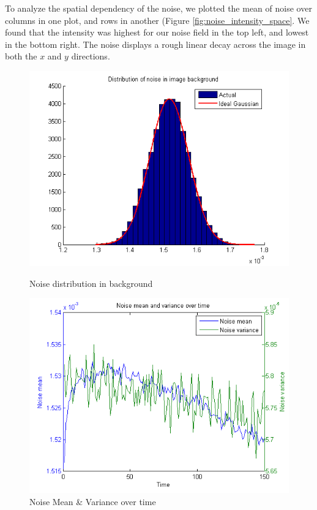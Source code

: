 \documentclass{article}
\begin{document}
To analyze the spatial dependency of the noise, we plotted the mean of noise over columns in one plot, and rows in another (Figure \ref{fig:noise_intensity_space}. We found that the intensity was highest for our noise field in the top left, and lowest in the bottom right. The noise displays a rough linear decay across the image in both the $x$ and $y$ directions.


\begin{figure}[b]
\begin{minipage}[b]{0.45\linewidth}
\centering
\includegraphics[width=\textwidth]{figures/noise_distribution_background.png}
\caption{Noise distribution in background}
\label{fig:noise_dist_background}
\end{minipage}
\hspace{0.5cm}
\begin{minipage}[b]{0.45\linewidth}
\centering
\includegraphics[width=\textwidth]{figures/noise_mean_variance_over_time.png}
\caption{Noise Mean \& Variance over time}
\label{fig:noise_mean_var_time}
\end{minipage}
\end{figure}
\end{document}
